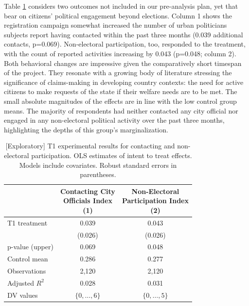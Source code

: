 \documentclass[
  11.5pt,
]{article}
\begin{document}
Table \ref{tab:t1_effects_on_contact} considers two outcomes not
included in our pre-analysis plan, yet that bear on citizens' political
engagement beyond elections. Column 1 shows the registration campaign
somewhat increased the number of urban politicians subjects report
having contacted within the past three months (0.039 additional
contacts, p=0.069). Non-electoral participation, too, responded to the
treatment, with the count of reported activities increasing by 0.043
(p=0.048; column 2). Both behavioral changes are impressive given the
comparatively short timespan of the project. They resonate with a
growing body of literature stressing the significance of claims-making
in developing country contexts: the need for active citizens to make
requests of the state if their welfare needs are to be met. The small
absolute magnitudes of the effects are in line with the low control
group means. The majority of respondents had neither contacted any city
official nor engaged in any non-electoral political activity over the
past three months, highlighting the depths of this group's
marginalization.

\begin{table}[!h]

\caption{\label{tab:unnamed-chunk-56}\label{tab:t1_effects_on_contact}[Exploratory] T1 experimental results for contacting and non-electoral participation. OLS estimates of intent to treat effects. Models include covariates. Robust standard errors in parentheses.}
\centering
\begin{tabular}[t]{lcc}
\toprule
 & \makecell[c]{Contacting City\\ Officials Index \\(1)} & \makecell[c]{Non-Electoral\\ Participation Index \\(2)}\\
\midrule
T1 treatment & 0.039 & 0.043\\
 & (0.026) & (0.026)\\
\midrule
p-value (upper) & 0.069 & 0.048\\
Control mean & 0.286 & 0.277\\
Observations & 2,120 & 2,120\\
Adjusted $R^2$ & 0.028 & 0.031\\
DV values & $\{0, \ldots, 6\}$ & $\{0, \ldots, 5\}$\\
\bottomrule
\end{tabular}
\end{table}
\end{document}
